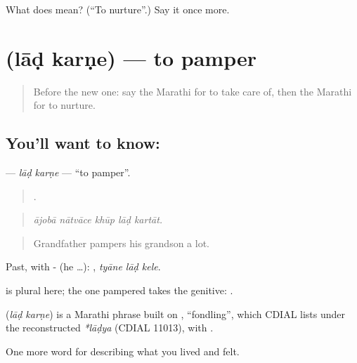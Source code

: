 \begin{tcolorbox}[breakable,colback=teal!4,colframe=teal!35!black,title={Before you move on}]
What does  mean? (\textquotedblleft{}To nurture\textquotedblright{}.) Say it once more.
\end{tcolorbox}
\section[\texorpdfstring{\mr{लाड} \mr{करणे} (lāḍ karṇe)}{लाड करणे (lāḍ karṇe)}]{  (lāḍ karṇe) — to pamper}

\label{lesson:MR-C500-lad-karne}



\begin{quote}
Before the new one: say the Marathi for to take care of, then the Marathi for to nurture.
\end{quote}

\subsection*{You'll want to know:  }
\textbf{ } — \emph{lāḍ karṇe} — \textquotedblleft{}to pamper\textquotedblright{}.

\begin{quote}
    .
\end{quote}

\begin{quote}
\emph{ājobā nātvāce khūp lāḍ kartāt.}
\end{quote}

\begin{quote}
Grandfather pampers his grandson a lot.
\end{quote}

Past, with - (he …):   , \emph{tyāne lāḍ kele}.

 is plural here; the one pampered takes the genitive:   .

\begin{cousinweb}
\textbf{ } (\emph{lāḍ karṇe}) is a Marathi phrase built on , \textquotedblleft{}fondling\textquotedblright{}, which CDIAL lists under the reconstructed \emph{*lāḍya} (CDIAL 11013), with .
\end{cousinweb}

\begin{grammarlens}[title={What you've built}]
One more word for describing what you lived and felt.
\end{grammarlens}

